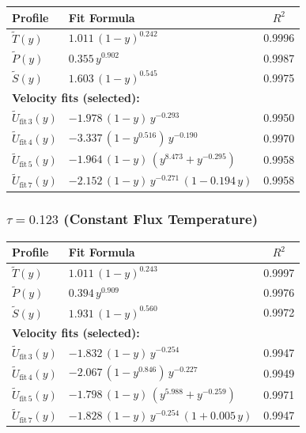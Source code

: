 \documentclass[11pt]{article}
\begin{document}
\begin{center}
\begin{tabular}{l l c}
\toprule
Profile & Fit Formula & $R^2$ \\
\midrule
$\tilde{T}(y)$ & $1.011\,(1-y)^{0.242}$ & 0.9996 \\
$\tilde{P}(y)$ & $0.355\,y^{0.902}$ & 0.9987 \\
$\tilde{S}(y)$ & $1.603\,(1-y)^{0.545}$ & 0.9975 \\
\midrule
\multicolumn{3}{l}{\textbf{Velocity fits (selected):}} \\
$\tilde{U}_{\mathrm{fit\,3}}(y)$ & $-1.978\,(1-y)\,y^{-0.293}$ & 0.9950 \\
$\tilde{U}_{\mathrm{fit\,4}}(y)$ & $-3.337\,(1-y^{0.516})\,y^{-0.190}$ & 0.9970 \\
$\tilde{U}_{\mathrm{fit\,5}}(y)$ & $-1.964\,(1-y)\,(y^{8.473}+y^{-0.295})$ & 0.9958 \\
$\tilde{U}_{\mathrm{fit\,7}}(y)$ & $-2.152\,(1-y)\,y^{-0.271}\,(1-0.194\,y)$ & 0.9958 \\
\bottomrule
\end{tabular}
\end{center}

\subsubsection{$\tau = 0.123$ (Constant Flux Temperature)}

\begin{center}
\begin{tabular}{l l c}
\toprule
Profile & Fit Formula & $R^2$ \\
\midrule
$\tilde{T}(y)$ & $1.011\,(1-y)^{0.243}$ & 0.9997 \\
$\tilde{P}(y)$ & $0.394\,y^{0.909}$ & 0.9976 \\
$\tilde{S}(y)$ & $1.931\,(1-y)^{0.560}$ & 0.9972 \\
\midrule
\multicolumn{3}{l}{\textbf{Velocity fits (selected):}} \\
$\tilde{U}_{\mathrm{fit\,3}}(y)$ & $-1.832\,(1-y)\,y^{-0.254}$ & 0.9947 \\
$\tilde{U}_{\mathrm{fit\,4}}(y)$ & $-2.067\,(1-y^{0.846})\,y^{-0.227}$ & 0.9949 \\
$\tilde{U}_{\mathrm{fit\,5}}(y)$ & $-1.798\,(1-y)\,(y^{5.988}+y^{-0.259})$ & 0.9971 \\
$\tilde{U}_{\mathrm{fit\,7}}(y)$ & $-1.828\,(1-y)\,y^{-0.254}\,(1+0.005\,y)$ & 0.9947 \\
\bottomrule
\end{tabular}
\end{center}
\end{document}
